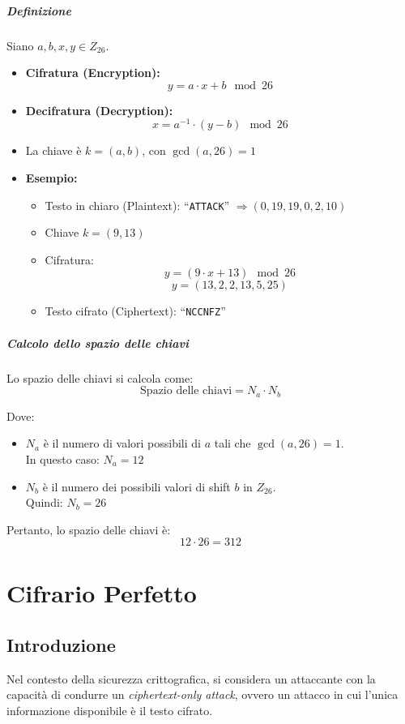 \documentclass{report}
\begin{document}
            \subparagraph{Definizione}

Siano $a, b, x, y \in Z_{26}$.

\begin{itemize}
    \item \textbf{Cifratura (Encryption):}
    \[
    y = a \cdot x + b \mod 26
    \]
    
    \item \textbf{Decifratura (Decryption):}
    \[
    x = a^{-1} \cdot (y - b) \mod 26
    \]
    
    \item La chiave è $k = (a, b)$, con $\gcd(a, 26) = 1$
    
    \item \textbf{Esempio:}
    \begin{itemize}
        \item Testo in chiaro (Plaintext): ``\texttt{ATTACK}'' $\Rightarrow (0, 19, 19, 0, 2, 10)$
        \item Chiave $k = (9, 13)$
        \item Cifratura:
        \[
        y = (9 \cdot x + 13) \mod 26
        \]
        \[
        y = (13, 2, 2, 13, 5, 25)
        \]
        \item Testo cifrato (Ciphertext): ``\texttt{NCCNFZ}''
    \end{itemize}
\end{itemize}

\subparagraph{Calcolo dello spazio delle chiavi}

Lo spazio delle chiavi si calcola come:
\[
\text{Spazio delle chiavi} = N_a \cdot N_b
\]

Dove:
\begin{itemize}
    \item $N_a$ è il numero di valori possibili di $a$ tali che $\gcd(a, 26) = 1$. \\
    In questo caso: $N_a = 12$
    \item $N_b$ è il numero dei possibili valori di shift $b$ in $Z_{26}$. \\
    Quindi: $N_b = 26$
\end{itemize}

Pertanto, lo spazio delle chiavi è:
\[
12 \cdot 26 = 312
\]


\section{Cifrario Perfetto}
  \subsection{Introduzione}
            Nel contesto della sicurezza crittografica, si considera un attaccante con la capacità di condurre un \textit{ciphertext-only attack}, ovvero un attacco in cui l'unica informazione disponibile è il testo cifrato.
\end{document}
